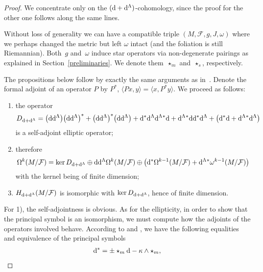 \documentclass[10pt,a4paper]{amsart}
\numberwithin{equation}{section}
\begin{document}
\begin{proof}
We concentrate only on the $({\rm d}+{\rm d}^{\Lambda})$-cohomology, since the proof for the other one follows along the same lines.

Without loss of generality we can have a compatible triple $(M,\mathcal{F},g,J,\omega)$ where we perhaps changed the metric but left $\omega$ intact (and the foliation is still Riemannian). Both~$g$ and~$\omega$ induce star operators via non-degenerate pairings as explained in Section~\ref{preliminaries}. We denote them~$\star_{m}$ and~$\star_{s}$, respectively.

The propositions below follow by exactly the same arguments as in~\cite{tseng}. Denote the formal adjoint of an operator $P$ by $P^*$, $\langle Px,y\rangle=\langle x,P^*y\rangle$. We proceed as follows:
\begin{enumerate}\itemsep=0pt
\item[1)] the operator
\begin{gather*}
D_{{\rm d}+{\rm d}^{\Lambda}}= \big({\rm d}{\rm d}^{\Lambda}\big)\big({\rm d}{\rm d}^{\Lambda}\big)^* + \big({\rm d}{\rm d}^{\Lambda}\big)^*\big({\rm d}{\rm d}^{\Lambda}\big)+{\rm d}^*{\rm d}^{\Lambda}{\rm d}^{\Lambda}{}^*{\rm d} + {\rm d}^{\Lambda}{}^*{\rm d}{\rm d}^*{\rm d}^{\Lambda} + \big({\rm d}^*{\rm d} +{\rm d}^{\Lambda}{}^*{\rm d}^{\Lambda}\big)
\end{gather*}
is a self-adjoint elliptic operator;
\item[2)] therefore
\begin{gather*}
\Omega^k(M\slash \mathcal{F})= \ker D_{{\rm d}+{\rm d}^{\Lambda}}\oplus {\rm d}{\rm d}^{\Lambda}\Omega^k(M\slash\mathcal{F}) \oplus \big({\rm d}^*\Omega^{k-1}(M\slash\mathcal{F})+{\rm d}^{\Lambda}{}^*\omega^{k-1}(M\slash\mathcal{F})\big)
\end{gather*}
with the kernel being of finite dimension;
\item[3)] $H_{{\rm d}+{\rm d}^{\Lambda}}(M\slash\mathcal{F})$ is isomorphic with $\ker D_{{\rm d}+{\rm d}^{\Lambda}}$, hence of finite dimension.
\end{enumerate}
For 1), the self-adjointness is obvious. As for the ellipticity, in order to show that the principal symbol is an isomorphism, we must compute how the adjoints of the operators involved behave. According to \cite[Proposition~3.3]{tseng} and \cite[Proposition~3.1]{pawel}, we have the following equalities and equivalence of the principal symbols
\begin{gather*}
{\rm d}^*= \pm \star_{m}{\rm d} - \kappa\wedge\star_{m},\\

\end{gather*}
\end{proof}
\end{document}
